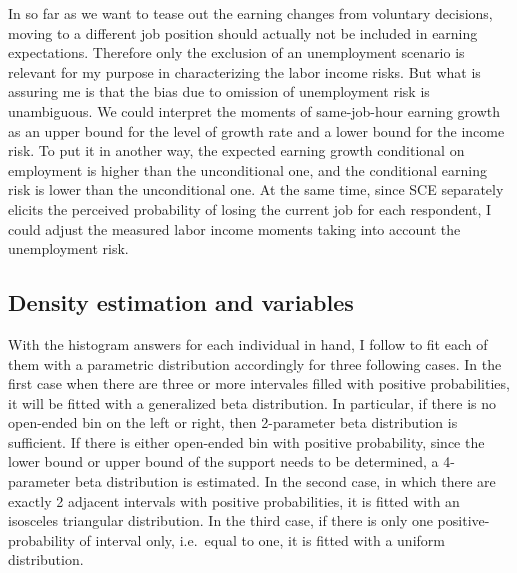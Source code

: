 \documentclass[12pt,notitlepage,onecolumn,aps,pra]{revtex4-1}
\begin{document}
In so far as we want to tease out the earning changes from voluntary
decisions, moving to a different job position should actually not be
included in earning expectations. Therefore only the exclusion of an
unemployment scenario is relevant for my purpose in characterizing the
labor income risks. But what is assuring me is that the bias due to
omission of unemployment risk is unambiguous. We could interpret the
moments of same-job-hour earning growth as an upper bound for the level
of growth rate and a lower bound for the income risk. To put it in
another way, the expected earning growth conditional on employment is
higher than the unconditional one, and the conditional earning risk is
lower than the unconditional one. At the same time, since SCE separately
elicits the perceived probability of losing the current job for each
respondent, I could adjust the measured labor income moments taking into
account the unemployment risk.

\hypertarget{density-estimation-and-variables}{%
\subsection{Density estimation and
variables}\label{density-estimation-and-variables}}

With the histogram answers for each individual in hand, I follow
\cite{engelberg_comparing_2009} to fit each of them with a parametric
distribution accordingly for three following cases. In the first case
when there are three or more intervales filled with positive
probabilities, it will be fitted with a generalized beta distribution.
In particular, if there is no open-ended bin on the left or right, then
2-parameter beta distribution is sufficient. If there is either
open-ended bin with positive probability, since the lower bound or upper
bound of the support needs to be determined, a 4-parameter beta
distribution is estimated. In the second case, in which there are
exactly 2 adjacent intervals with positive probabilities, it is fitted
with an isosceles triangular distribution. In the third case, if there
is only one positive-probability of interval only, i.e.~equal to one, it
is fitted with a uniform distribution.
\end{document}
